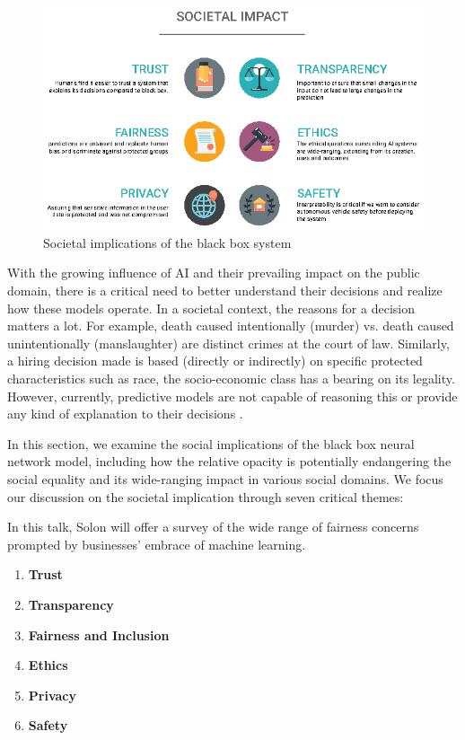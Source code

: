 \begin{figure}[htbp]
\centering
\includegraphics[width=1\textwidth]{images/societal-impact-copy.eps}
\caption{Societal implications of the black box system}
\label{fig:societal-impacts}
\end{figure}

With the growing influence of AI and their prevailing impact on the public domain, there is a critical need to better understand their decisions and realize how these models operate.  In a societal context, the reasons for a decision matters a lot. For example, death caused intentionally (murder) vs. death caused unintentionally (manslaughter) are distinct crimes at the court of law. Similarly, a hiring decision made is based (directly or indirectly) on specific protected characteristics such as race, the socio-economic class has a bearing on its legality. However, currently, predictive models are not capable of reasoning this or provide any kind of explanation to their decisions \cite{molnar}.

In this section, we examine the social implications of the black box neural network model, including how the relative opacity is potentially endangering the social equality and its wide-ranging impact in various social domains. We focus our discussion on the societal implication through seven critical themes:

In this talk, Solon will offer a survey of the wide range of fairness concerns prompted by businesses' embrace of machine learning.

\begin{enumerate}
\item \textbf{Trust}
\item  \textbf{Transparency}
\item \textbf{Fairness and Inclusion}
\item \textbf{Ethics}
\item \textbf{Privacy}
\item \textbf{Safety}
\end{enumerate}

